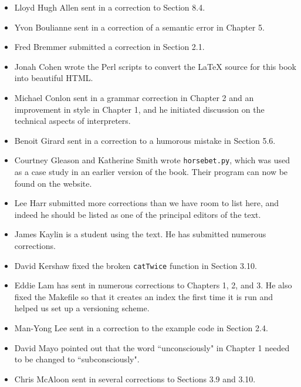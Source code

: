 \documentclass[10pt]{book}
\begin{document}
\begin{itemize}

\small
\item Lloyd Hugh Allen sent in a correction to Section 8.4.

\item Yvon Boulianne sent in a correction of a semantic error in
Chapter 5.

\item Fred Bremmer submitted a correction in Section 2.1.

\item Jonah Cohen wrote the Perl scripts to convert the
LaTeX source for this book into beautiful HTML.

\item Michael Conlon sent in a grammar correction in Chapter 2
and an improvement in style in Chapter 1, and he initiated discussion
on the technical aspects of interpreters.

\item Benoit Girard sent in a
correction to a humorous mistake in Section 5.6.

\item Courtney Gleason and Katherine Smith wrote {\tt horsebet.py},
which was used as a case study in an earlier version of the book.  Their
program can now be found on the website.

\item Lee Harr submitted more corrections than we have room to list
here, and indeed he should be listed as one of the principal editors
of the text.

\item James Kaylin is a student using the text. He has submitted
numerous corrections.

\item David Kershaw fixed the broken {\tt catTwice} function in Section
3.10.

\item Eddie Lam has sent in numerous corrections to Chapters 
1, 2, and 3.
He also fixed the Makefile so that it creates an index the first time it is
run and helped us set up a versioning scheme.  

\item Man-Yong Lee sent in a correction to the example code in
Section 2.4.  

\item David Mayo pointed out that the word ``unconsciously"
in Chapter 1 needed
to be changed to ``subconsciously".

\item Chris McAloon sent in several corrections to Sections 3.9 and
3.10.


\end{itemize}
\end{document}
